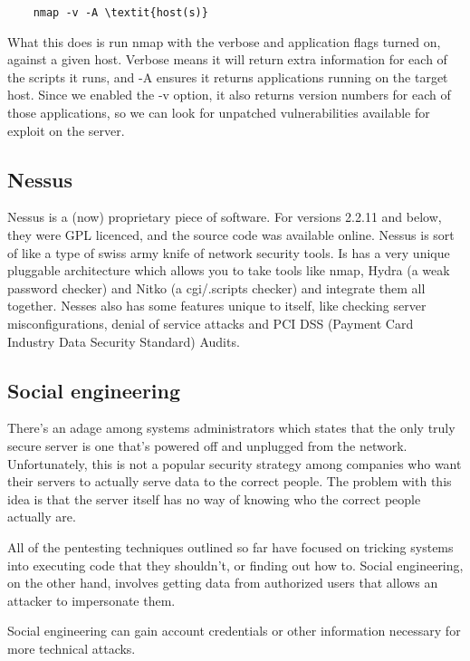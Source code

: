 \documentclass{report}
\begin{document}
\begin{verbatim}
    nmap -v -A \textit{host(s)}
\end{verbatim}

What this does is run nmap with the verbose and application flags turned on,
against a given host. Verbose means it will return extra information for each 
of the scripts it runs, and -A ensures it returns applications running on the
target host. Since we enabled the -v option, it also returns version numbers
for each of those applications, so we can look for unpatched vulnerabilities
available for exploit on the server.

\subsection*{Nessus}

Nessus is a (now) proprietary piece of software. For versions 2.2.11 and below,
they were GPL licenced, and the source code was available online. Nessus is
sort of like a type of swiss army knife of network security tools. Is has
a very unique pluggable architecture which allows you to take tools like
nmap, Hydra (a weak password checker) and Nitko (a cgi/.scripts checker) and
integrate them all together. Nesses also has some features unique to itself,
like checking server misconfigurations, denial of service attacks and
PCI DSS (Payment Card Industry Data Security Standard) Audits.

\subsection*{Social engineering}

There's an adage among systems administrators which states that the only truly
secure server is one that's powered off and unplugged from the network.
Unfortunately, this is not a popular security strategy among companies who
want their servers to actually serve data to the correct people. The problem
with this idea is that the server itself has no way of knowing who the correct
people actually are. 

All of the pentesting techniques outlined so far have focused on tricking
systems into executing code that they shouldn't, or finding out how to. Social
engineering, on the other hand, involves getting data from authorized users
that allows an attacker to impersonate them. 

Social engineering can gain account credentials or other information necessary
for more technical attacks. 
\end{document}
